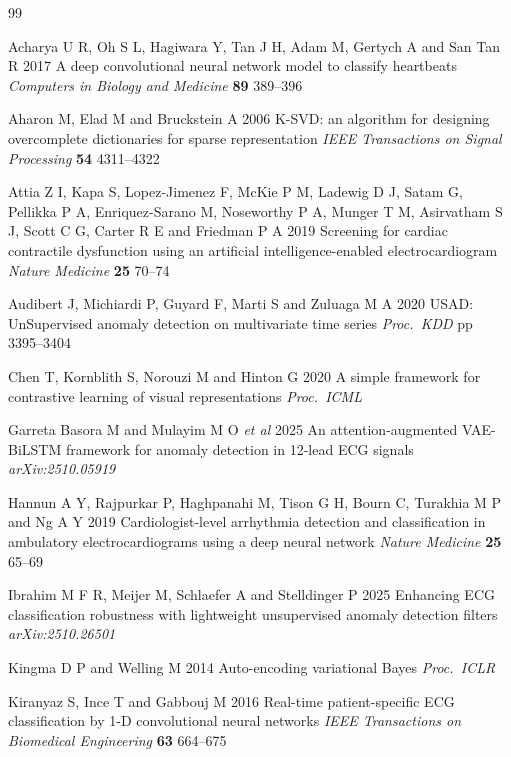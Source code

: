 \documentclass{iopjournal}
\begin{document}
\begin{thebibliography}{99}

 Acharya U R, Oh S L, Hagiwara Y, Tan J H, Adam M, Gertych A and San Tan R 2017 A deep convolutional neural network model to classify heartbeats \emph{Computers in Biology and Medicine} \textbf{89} 389--396

 Aharon M, Elad M and Bruckstein A 2006 K-SVD: an algorithm for designing overcomplete dictionaries for sparse representation \emph{IEEE Transactions on Signal Processing} \textbf{54} 4311--4322

 Attia Z I, Kapa S, Lopez-Jimenez F, McKie P M, Ladewig D J, Satam G, Pellikka P A, Enriquez-Sarano M, Noseworthy P A, Munger T M, Asirvatham S J, Scott C G, Carter R E and Friedman P A 2019 Screening for cardiac contractile dysfunction using an artificial intelligence-enabled electrocardiogram \emph{Nature Medicine} \textbf{25} 70--74

 Audibert J, Michiardi P, Guyard F, Marti S and Zuluaga M A 2020 USAD: UnSupervised anomaly detection on multivariate time series \emph{Proc.\ KDD} pp 3395--3404

 Chen T, Kornblith S, Norouzi M and Hinton G 2020 A simple framework for contrastive learning of visual representations \emph{Proc.\ ICML}

 Garreta Basora M and Mulayim M O \emph{et al} 2025 An attention-augmented VAE-BiLSTM framework for anomaly detection in 12-lead ECG signals \emph{arXiv:2510.05919}

 Hannun A Y, Rajpurkar P, Haghpanahi M, Tison G H, Bourn C, Turakhia M P and Ng A Y 2019 Cardiologist-level arrhythmia detection and classification in ambulatory electrocardiograms using a deep neural network \emph{Nature Medicine} \textbf{25} 65--69

 Ibrahim M F R, Meijer M, Schlaefer A and Stelldinger P 2025 Enhancing ECG classification robustness with lightweight unsupervised anomaly detection filters \emph{arXiv:2510.26501}

 Kingma D P and Welling M 2014 Auto-encoding variational Bayes \emph{Proc.\ ICLR}

 Kiranyaz S, Ince T and Gabbouj M 2016 Real-time patient-specific ECG classification by 1-D convolutional neural networks \emph{IEEE Transactions on Biomedical Engineering} \textbf{63} 664--675


\end{thebibliography}
\end{document}
